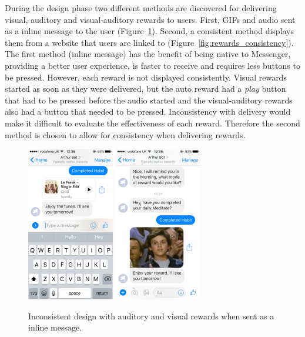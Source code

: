 During the design phase two different methods are discovered for delivering visual, auditory and visual-auditory rewards to users. First, GIFs and audio sent as a inline message to the user (Figure~\ref{fig:rewards_inline}). Second, a consistent method displays them from a website that users are linked to (Figure~\ref{fig:rewards_consistency}). The first method (inline message) has the benefit of being native to Messenger, providing a better user experience, is faster to receive and requires less buttons to be pressed. However, each reward is not displayed consistently. Visual rewards started as soon as they were delivered, but the auto reward had a \textit{play} button that had to be pressed before the audio started and the visual-auditory rewards also had a button that needed to be pressed. Inconsistency with delivery would make it difficult to evaluate the effectiveness of each reward. Therefore the second method is chosen to allow for consistency when delivering rewards.

\begin{figure}[H]
  \centering
  \includegraphics[width=1.5in]{../resources/design/reward-audio-inline.png}
  \hspace{10px}
  \includegraphics[width=1.5in]{../resources/design/reward-visual-inline.png}
  \caption{Inconsistent design with auditory and visual rewards when sent as a inline message.}
  \label{fig:rewards_inline}
\end{figure}

